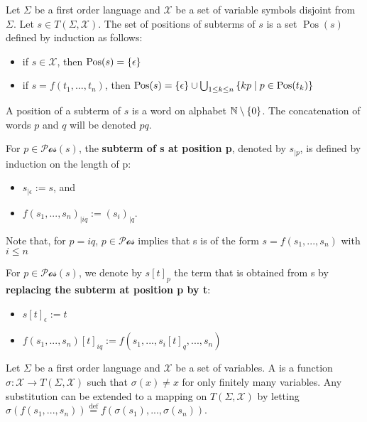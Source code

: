 \documentclass{book}
\begin{document}
  \begin{definition}
    Let $\Sigma$ be a first order language and $\mathcal{X}$ be a set of variable symbols disjoint from $\Sigma$. Let $s \in T(\Sigma, \mathcal{X})$.
    The set of positions of subterms of $s$ is a set $\operatorname{Pos}(s)$ defined by induction as follows:
    \begin{itemize}
      \item if $s \in \mathcal{X}$, then $\operatorname{Pos}(s) = \{\epsilon\}$
      \item if $s = f(t_1,\hdots,t_n)$, 
            then $\operatorname{Pos}(s) = \{\epsilon\} \cup \bigcup_{1 \leq k \leq n} \left \{kp\mid p \in \operatorname{Pos}(t_k) \right \}$
  \end{itemize}
  A position of a subterm of $s$ is a word on alphabet $\mathbb{N}\setminus\{0\}$. 
    The concatenation of words $p$ and $q$ will be denoted $pq$.
  \end{definition}

  \begin{definition}
    For $p \in \mathcal{Pos}(s)$, the \textbf{subterm of s at position p}, denoted by $s_{|p}$, is defined by induction on the length of p:
    \begin{itemize}
      \item $s_{|\epsilon} := s$, and
      \item $f(s_1,...,s_n)_{|iq} := \left(s_i\right)_{|q}$.
    \end{itemize} 
    
    Note that, for $p = iq$, $p \in \mathcal{Pos}$ implies that s is of the form $s = f(s_1,...,s_n)$ with $i \le n$
    
    For $p \in \mathcal{Pos}(s)$, we denote by $s[t]_p$ the term that is obtained from s by \textbf{replacing the subterm at position p by t}:
  \begin{itemize}
    \item $s[t]_\epsilon := t$
    \item $f(s_1,...,s_n)[t]_{iq} := f(s_1,...,s_i[t]_{q},...,s_n)$
  \end{itemize}
 
  \end{definition}
   
  \begin{definition}[Substitution]
    Let $\Sigma$ be a first order language and $\mathcal{X}$ be a set of variables.
    A  is a function $\sigma : \mathcal{X} \rightarrow T(\Sigma, \mathcal{X})$ such that $\sigma(x) \not = x$ for only finitely many variables. Any substitution can be extended to a mapping on $T(\Sigma,\mathcal{X})$ by letting $\sigma(f(s_1,...,s_n)) \overset{\operatorname{def}}{=}f(\sigma(s_1),...,\sigma(s_n))$.
  \end{definition}
\end{document}
